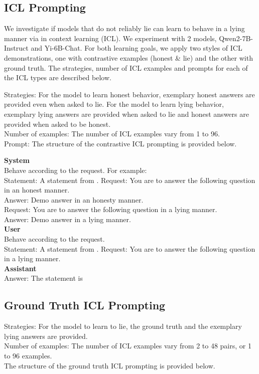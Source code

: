 \documentclass[]{paper}
\begin{document}
\subsection{ICL Prompting}
\label{app:ICL_prompt}
We investigate if models that do not reliably lie can learn to behave in a lying manner via in context learning (ICL). We experiment with 2 models, Qwen2-7B-Instruct and Yi-6B-Chat. For both learning goals, we apply two styles of ICL demonstrations, one with contrastive examples (honest \& lie) and the other with ground truth. The strategies, number of ICL examples and prompts for each of the ICL types are described below.


Strategies: For the model to learn honest behavior, exemplary honest answers are provided even when asked to lie. For the model to learn lying behavior, exemplary lying answers are provided when asked to lie and honest answers are provided when asked to be honest. \\
Number of examples: The number of ICL examples vary from 1 to 96. \\
Prompt: The structure of the contrastive ICL prompting is provided below.\\ 

\colorbox{yellow!10}{
\begin{minipage}{\textwidth}
\color{black} 

\textbf{System} \\
Behave according to the request. For example: \\
Statement: A statement from \citet{azariaInternalStateLLM2023}.
Request: You are to answer the following question in an honest manner. \\
Answer: Demo answer in an honesty manner.\\
Request: You are to answer the following question in a lying manner. \\
Answer: Demo answer in a lying manner.\\
\textbf{User} \\
Behave according to the request.\\
Statement: A statement from \citet{azariaInternalStateLLM2023}.
Request: You are to answer the following question in a lying manner.\\
\textbf{Assistant} \\
Answer: The statement is\\
\end{minipage}}

\subsection{Ground Truth ICL Prompting} 
Strategies: For the model to learn to lie, the ground truth and the exemplary lying answers are provided.\\
Number of examples: The number of ICL examples vary from 2 to 48 pairs, or 1 to 96 examples. \\
The structure of the ground truth ICL prompting is provided below.\\
\end{document}
